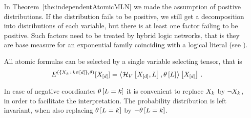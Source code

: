 
In Theorem~\ref{the:independentAtomicMLN} we made the assumption of positive distributions.
If the distribution fails to be positive, we still get a decomposition into distributions of each variable, but there is at least one factor failing to be positive.
Such factors need to be treated by hybrid logic networks, that is they are base measure for an exponential family coinciding with a logical literal (see ).

All atomic formulas can be selected by a single variable selecting tensor, that is
	\[ E^{(\{X_{k} \, : \, k\in[d]\},\theta)}[X_{[d]}]
	= \left\langle \mathcal{H}_{V}\left[X_{[d]},L\right],\theta\left[L\right]\right\rangle \left[ X_{[d]} \right] \, . 
	\]
	
In case of negative coordiantes $\theta\left[L=k\right]$ it is convenient to replace $X_{k}$ by $\lnot X_{k}$, in order to facilitate the interpretation.
The probability distribution is left invariant, when also replacing $\theta\left[L=k\right]$ by $-\theta\left[L=k\right]$.




